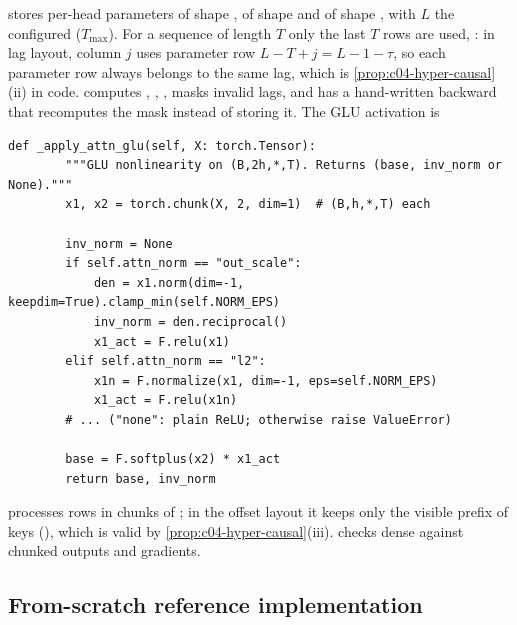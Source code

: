 \begin{implnote}[title={In the code: mixing and activation}]
 stores per-head parameters  of shape , 
of shape  and  of shape , with $L$ the configured
 ($T_{\max}$). For a sequence of length $T$ only the last $T$ rows are used,
: in lag layout, column $j$ uses parameter row $L-T+j=L-1-\tau$, so each
parameter row always belongs to the same lag, which is \cref{prop:c04-hyper-causal}(ii) in code.
 computes , ,
, masks invalid lags, and has a hand-written backward that recomputes
the mask instead of storing it. The GLU activation is
\begin{lstlisting}[caption={Excerpt from \texttt{repos/\allowbreak{}LJC-FVNR\_\_HyperMLP/\allowbreak{}hyperglu.py}},label={lst:c04-hyper-glu}]
    def _apply_attn_glu(self, X: torch.Tensor):
        """GLU nonlinearity on (B,2h,*,T). Returns (base, inv_norm or None)."""
        x1, x2 = torch.chunk(X, 2, dim=1)  # (B,h,*,T) each

        inv_norm = None
        if self.attn_norm == "out_scale":
            den = x1.norm(dim=-1, keepdim=True).clamp_min(self.NORM_EPS)
            inv_norm = den.reciprocal()
            x1_act = F.relu(x1)
        elif self.attn_norm == "l2":
            x1n = F.normalize(x1, dim=-1, eps=self.NORM_EPS)
            x1_act = F.relu(x1n)
        # ... ("none": plain ReLU; otherwise raise ValueError)

        base = F.softplus(x2) * x1_act
        return base, inv_norm
\end{lstlisting}
 processes rows in chunks of ; in the offset layout it keeps
only the visible prefix of keys (), which is valid by
\cref{prop:c04-hyper-causal}(iii).  checks dense against
chunked outputs and gradients.
\end{implnote}

\subsection{From-scratch reference implementation}

